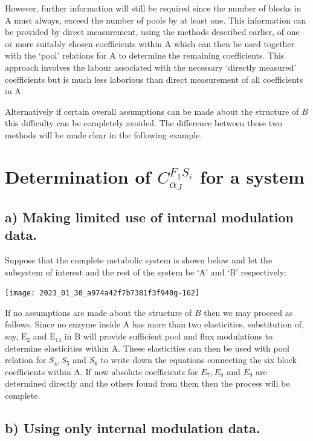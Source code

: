 However, further information will still be required since the number of blocks in A must always, exceed the number of pools by at least one. This information can be provided by direct measurement, using the methods described earlier, of one or more suitably chosen coefficients within A which can then be used together with the `pool' relations for A to determine the remaining coefficients. This approach involves the labour associated with the necessary `directly measured' coefficients but is much less laborious than direct measurement of all coefficients in A.

Alternatively if certain overall assumptions can be made about the structure of $B$ this difficulty can be completely avoided. The difference between these two methods will be made clear in the following example.

\section{Determination of $C^{F_{1} S_{i}}_{\alpha_J}$ for a system}

\subsection*{a) Making limited use of internal modulation data.}

Suppose that the complete metabolic system is shown below and let the subsystem of interest and the rest of the system be `A' and `B' respectively:

\begin{center}
\texttt{[image: 2023\_01\_30\_a974a42f7b7381f3f940g-162]}
\end{center}

If no assumptions are made about the structure of $B$ then we may proceed as follows. Since no enzyme inside A has more than two elasticities, substitution of, say, $\mathrm{E}_{2}$ and $\mathrm{E}_{14}$ in $\mathrm{B}$ will provide sufficient pool and flux modulations to determine elasticities within A. These elasticities can then be used with pool relation for $S_{4}, S_{5}$ and $S_{6}$ to write down the equations connecting the six block coefficients within A. If now absolute coefficients for $E_{7}, E_{8}$ and $E_{9}$ are determined directly and the others found from them then the process will be complete.

\subsection*{b) Using only internal modulation data.}

